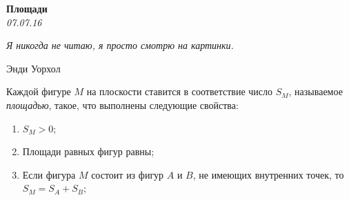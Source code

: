 \begin{center}
\textbf{\Large Площади}\\
\textit{07.07.16}

\epigraph{\it Я никогда не читаю, я просто смотрю на картинки.}{Энди Уорхол}

 Каждой фигуре $M$ на плоскости ставится в соответствие число $S_M$, называемое \textit{площадью}, такое, что выполнены следующие свойства:

\begin{enumerate}
	\item $S_M > 0$;
	\item Площади равных фигур равны;
	\item Если фигура $M$ состоит из фигур $A$ и $B$, не имеющих внутренних точек, то $S_M = S_A + S_B$;
\end{enumerate}

\end{center}

